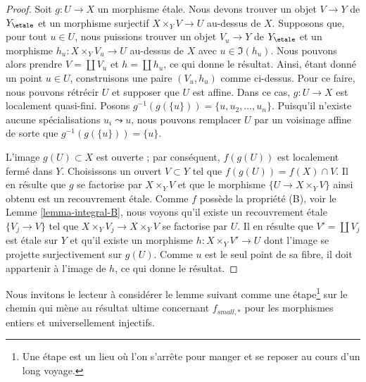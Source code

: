 \begin{proof}
Soit $g : U \to X$ un morphisme \'etale. Nous devons trouver un objet
$V \to Y$ de $Y_\etale$ et un morphisme surjectif $X \times_Y V \to U$
au-dessus de $X$. Supposons que, pour tout $u \in U$, nous puissions trouver un objet
$V_u \to Y$ de $Y_\etale$ et un morphisme $h_u : X \times_Y V_u \to U$
au-dessus de $X$ avec $u \in \Im(h_u)$. Nous pouvons alors prendre $V = \coprod V_u$
et $h = \coprod h_u$, ce qui donne le r\'esultat. Ainsi, \'etant donn\'e un point
$u \in U$, construisons une paire $(V_u, h_u)$ comme ci-dessus. Pour ce faire, nous pouvons
r\'etr\'ecir $U$ et supposer que $U$ est affine. Dans ce cas,
$g : U \to X$ est localement quasi-fini. Posons
$g^{-1}(g(\{u\})) = \{u, u_2, \ldots, u_n\}$. Puisqu'il n'existe aucune
sp\'ecialisations $u_i \leadsto u$, nous pouvons remplacer $U$ par un voisinage affine
de sorte que $g^{-1}(g(\{u\})) = \{u\}$.

\medskip\noindent
L'image $g(U) \subset X$ est ouverte ;
par cons\'equent, $f(g(U))$ est localement ferm\'e dans $Y$. Choisissons un ouvert $V \subset Y$ tel
que $f(g(U)) = f(X) \cap V$. Il en r\'esulte que $g$ se factorise par
$X \times_Y V$ et que le morphisme $\{U \to X \times_Y V\}$ ainsi obtenu est un recouvrement
\'etale. Comme $f$ poss\`ede la propri\'et\'e (B), voir le
Lemme \ref{lemma-integral-B},
nous voyons qu'il existe un recouvrement \'etale $\{V_j \to V\}$ tel que
$X \times_Y V_j \to X \times_Y V$ se factorise par $U$.
Il en r\'esulte que $V' = \coprod V_j$ est \'etale sur $Y$ et qu'il existe un
morphisme $h : X \times_Y V' \to U$ dont l'image
se projette surjectivement sur $g(U)$. Comme $u$ est le seul point de sa fibre, il doit
appartenir \`a l'image de $h$, ce qui donne le r\'esultat.
\end{proof}

\noindent
Nous invitons le lecteur \`a consid\'erer le lemme suivant comme une
\'etape\footnote{Une \'etape est un lieu o\`u l'on s'arr\^ete pour manger
et se reposer au cours d'un long voyage.} sur le chemin qui m\`ene au
r\'esultat ultime concernant $f_{small, *}$ pour les morphismes entiers et universellement
injectifs.

